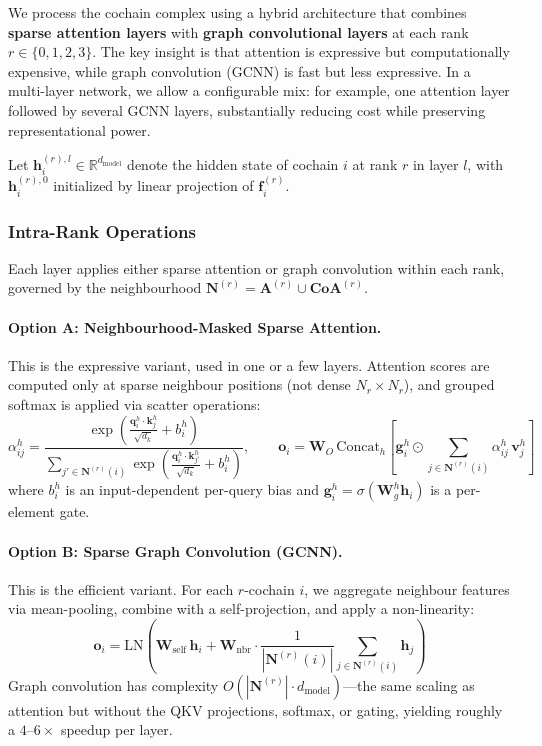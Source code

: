 \documentclass{article}
\begin{document}
We process the cochain complex using a hybrid architecture that combines \textbf{sparse attention layers} with \textbf{graph convolutional layers} at each rank $r \in \{0, 1, 2, 3\}$. The key insight is that attention is expressive but computationally expensive, while graph convolution (GCNN) is fast but less expressive. In a multi-layer network, we allow a configurable mix: for example, one attention layer followed by several GCNN layers, substantially reducing cost while preserving representational power.

Let $\mathbf{h}_i^{(r),l} \in \mathbb{R}^{d_{\text{model}}}$ denote the hidden state of cochain $i$ at rank $r$ in layer $l$, with $\mathbf{h}_i^{(r),0}$ initialized by linear projection of $\mathbf{f}_i^{(r)}$.

\subsubsection{Intra-Rank Operations}

Each layer applies either sparse attention or graph convolution within each rank, governed by the neighbourhood $\mathbf{N}^{(r)} = \mathbf{A}^{(r)} \cup \mathbf{CoA}^{(r)}$.

\paragraph{Option A: Neighbourhood-Masked Sparse Attention.} This is the expressive variant, used in one or a few layers. Attention scores are computed only at sparse neighbour positions (not dense $N_r \times N_r$), and grouped softmax is applied via scatter operations:
\begin{equation}
    \alpha_{ij}^h = \frac{\exp\left(\frac{\mathbf{q}_i^h \cdot \mathbf{k}_j^h}{\sqrt{d_k}} + b_i^h\right)}{\sum_{j' \in \mathbf{N}^{(r)}(i)} \exp\left(\frac{\mathbf{q}_i^h \cdot \mathbf{k}_{j'}^h}{\sqrt{d_k}} + b_i^h\right)}, \qquad
    \mathbf{o}_i = \mathbf{W}_O \, \text{Concat}_h\left[\mathbf{g}_i^h \odot \sum_{j \in \mathbf{N}^{(r)}(i)} \alpha_{ij}^h \, \mathbf{v}_j^h\right]
\end{equation}
where $b_i^h$ is an input-dependent per-query bias and $\mathbf{g}_i^h = \sigma(\mathbf{W}_g^h \mathbf{h}_i)$ is a per-element gate.

\paragraph{Option B: Sparse Graph Convolution (GCNN).} This is the efficient variant. For each $r$-cochain $i$, we aggregate neighbour features via mean-pooling, combine with a self-projection, and apply a non-linearity:
\begin{equation}
    \mathbf{o}_i = \text{LN}\!\left(\mathbf{W}_{\text{self}} \, \mathbf{h}_i + \mathbf{W}_{\text{nbr}} \cdot \frac{1}{|\mathbf{N}^{(r)}(i)|} \sum_{j \in \mathbf{N}^{(r)}(i)} \mathbf{h}_j\right)
\end{equation}
Graph convolution has complexity $O(|\mathbf{N}^{(r)}| \cdot d_{\text{model}})$---the same scaling as attention but without the QKV projections, softmax, or gating, yielding roughly a $4\text{--}6\times$ speedup per layer.
\end{document}
